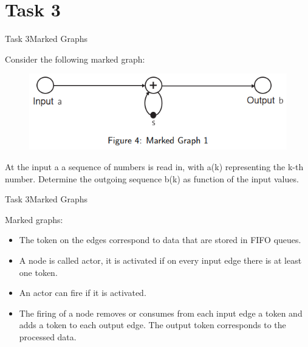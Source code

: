 \section{Task 3}

\setcounter{task}{1}
\begin{frame}{Task 3}{Marked Graphs}
    \begin{tasknoinc}
        Consider the following marked graph:
        \begin{figure}
            \centering
            \includegraphics[scale=0.6]{figures/markedGraph.PNG}
        \end{figure}
        At the input a a sequence of numbers is read in, with a(k) representing the k-th number. Determine the outgoing sequence b(k) as function of the input values.
    \end{tasknoinc}
\end{frame}
\begin{frame}{Task 3}{Marked Graphs}
    \begin{requirementsnoinc}
        Marked graphs:
        \begin{itemize}
            \item The \alert{token} on the edges correspond to data that are stored in \alert{FIFO} queues.
            \item A node is called \alert{actor}, it is \alert{activated} if on every input edge there is at least one token.
            \item An actor can \alert{fire} if it is activated.
            \item The \alert{firing of a node} removes or consumes from each input edge a token and adds a token to each output edge. The output token corresponds to the processed data.
        \end{itemize}
    \end{requirementsnoinc}
\end{frame}
